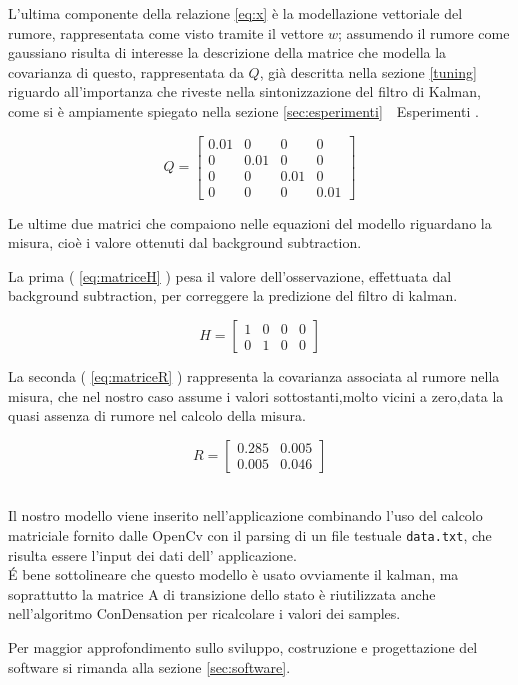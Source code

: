 L'ultima componente della relazione \ref{eq:x} è la modellazione vettoriale del rumore, rappresentata come visto tramite il vettore $w$; assumendo il rumore come gaussiano risulta di interesse la descrizione della matrice che modella la covarianza di questo, rappresentata da $Q$, già descritta nella sezione \ref{tuning} riguardo all'importanza che riveste nella sintonizzazione del filtro di Kalman, come si è ampiamente spiegato nella sezione \ref{sec:esperimenti}~~Esperimenti .

 
\begin{equation}
Q = \begin{bmatrix} 
0.01 & 0 & 0 & 0\\
0 & 0.01 & 0 & 0\\
0 & 0 & 0.01 & 0\\
0 & 0 & 0 & 0.01
\end{bmatrix}\end{equation} 




Le ultime due matrici che compaiono nelle equazioni del modello riguardano la misura, cioè i valore ottenuti dal background subtraction. 

La prima ( \ref{eq:matriceH} ) pesa il valore dell'osservazione, effettuata dal background subtraction, per correggere la predizione del filtro di kalman.

\begin{equation} \label{eq:matriceH}
 H = \begin{bmatrix} 
1 & 0 & 0 & 0\\
0 & 1 & 0 & 0
\end{bmatrix}
\end{equation}


La seconda ( \ref{eq:matriceR} ) rappresenta la covarianza associata al rumore nella misura, che nel nostro caso assume i valori sottostanti,molto vicini a zero,data la quasi assenza di rumore nel calcolo della misura.


\begin{equation}\label{eq:matriceR}
 R = \begin{bmatrix} 
0.285 & 0.005\\
0.005 & 0.046
\end{bmatrix} 
\end{equation}

~\\
Il nostro modello viene inserito nell'applicazione combinando l'uso del calcolo matriciale fornito dalle OpenCv con il parsing di un file testuale \texttt{data.txt}, che risulta essere l'input dei dati dell' applicazione.\\

\'E bene sottolineare che questo modello è usato ovviamente il kalman, ma soprattutto la matrice A di transizione dello stato è riutilizzata anche nell'algoritmo ConDensation per ricalcolare i valori dei samples.


Per maggior approfondimento sullo sviluppo, costruzione e progettazione del software si rimanda alla sezione \ref{sec:software}.
